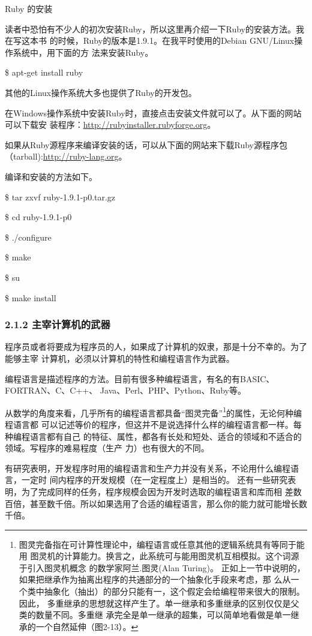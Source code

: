 \documentclass[color=cyan,mathpazo,titlestyle=hang]{elegantbook}
\begin{document}
Ruby 的安装

读者中恐怕有不少人的初次安装Ruby，所以这里再介绍一下Ruby的安装方法。我在写这本书
的时候，Ruby的版本是1.9.1。在我平时使用的Debian GNU/Linux操作系统中，用下面的方
法来安装Ruby。

\$ apt-get install ruby

其他的Linux操作系统大多也提供了Ruby的开发包。

在Windows操作系统中安装Ruby时，直接点击安装文件就可以了。从下面的网站可以下载安
装程序：\url{http://rubyinstaller.rubyforge.org}。

如果从Ruby源程序来编译安装的话，可以从下面的网站来下载Ruby源程序包
（tarball):\url{http://ruby-lang.org}。

编译和安装的方法如下。

\$ tar zxvf ruby-1.9.1-p0.tar.gz

\$ cd ruby-1.9.1-p0

\$ ./configure

\$ make

\$ su

\$ make install

\subsubsection{2.1.2 主宰计算机的武器}
\label{sec:org955fccc}

程序员或者将要成为程序员的人，如果成了计算机的奴隶，那是十分不幸的。为了能够主宰
计算机，必须以计算机的特性和编程语言作为武器。

编程语言是描述程序的方法。目前有很多种编程语言，有名的有BASIC、FORTRAN、C、C++、
Java、Perl、PHP、Python、Ruby等。

从数学的角度来看，几乎所有的编程语言都具备“图灵完备”\footnote{图灵完备指在可计算性理论中，编程语言或任意其他的逻辑系统具有等同于能用
  图灵机的计算能力。换言之，此系统可与能用图灵机互相模拟。这个词源于引入图灵机概念
  的数学家阿兰.图灵(Alan Turing)。
  正如上一节中说明的，如果把继承作为抽离出程序的共通部分的一个抽象化手段来考虑，那
  么从一个类中抽象化（抽出）的部分只能有一，这个假定会给编程带来很大的限制。因此，
  多重继承的思想就这样产生了。单一继承和多重继承的区别仅仅是父类的数量不同。多重继
  承完全是单一继承的超集，可以简单地看做是单一继承的一个自然延伸（图2-13）。}的属性，无论何种编程语言都
可以记述等价的程序，但这并不是说选择什么样的编程语言都一样。每种编程语言都有自己
的特征、属性，都各有长处和短处、适合的领域和不适合的领域。写程序的难易程度（生产
力）也有很大的不同。

有研究表明，开发程序时用的编程语言和生产力并没有关系，不论用什么编程语言，一定时
间内程序的开发规模（在一定程度上）是相当的。
还有一些研究表明，为了完成同样的任务，程序规模会因为开发时选取的编程语言和库而相
差数百倍，甚至数千倍。所以如果选用了合适的编程语言，那么你的能力就可能增长数千倍。
\end{document}
